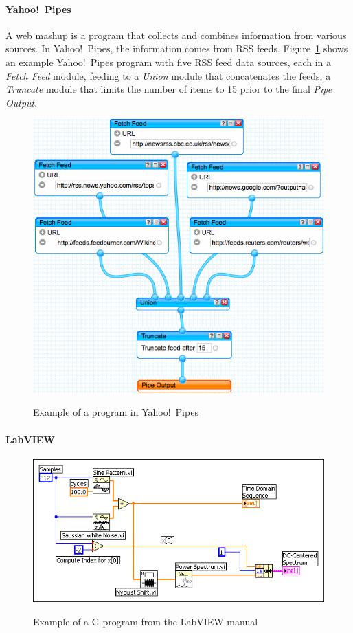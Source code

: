 \documentclass[10pt,conference,compsocconf]{IEEEtran}
\begin{document}
\paragraph{Yahoo!\ Pipes}
A web mashup is a program that collects and combines information from various
sources. 
In  Yahoo!\ Pipes, the information comes from RSS feeds. Figure~\ref{fig:ypexample} shows an example Yahoo!\ Pipes program with five RSS feed data sources, each in a \emph{Fetch Feed} module, feeding to a \emph{Union} module that concatenates the feeds, a \emph{Truncate} module that limits the number of items to 15 prior to the final \emph{Pipe Output}. 

\begin{figure}
\caption{Example of a program in Yahoo!\ Pipes}
\centering
\includegraphics[width=\columnwidth]{yp-1}
\label{fig:ypexample}
\end{figure}


\paragraph{LabVIEW}
\begin{figure}
\caption{Example of a G program from the LabVIEW manual}
\centering
\includegraphics[width=\columnwidth]{labview-1}
\label{fig:labviewexample}
\end{figure}
\end{document}
